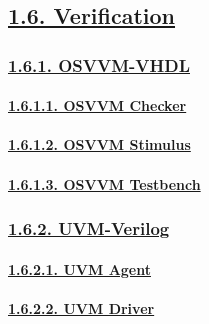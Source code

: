 \documentclass[
]{article}
\begin{document}
\hypertarget{verification}{%
\subsection{\texorpdfstring{\protect\hyperlink{verification-1}{1.6.
Verification}}{1.6. Verification}}\label{verification}}

\hypertarget{osvvm-vhdl}{%
\subsubsection{\texorpdfstring{\protect\hyperlink{osvvm-vhdl-1}{1.6.1.
OSVVM-VHDL}}{1.6.1. OSVVM-VHDL}}\label{osvvm-vhdl}}

\hypertarget{osvvm-checker}{%
\paragraph{\texorpdfstring{\protect\hyperlink{osvvm-checker-1}{1.6.1.1.
OSVVM Checker}}{1.6.1.1. OSVVM Checker}}\label{osvvm-checker}}

\hypertarget{osvvm-stimulus}{%
\paragraph{\texorpdfstring{\protect\hyperlink{osvvm-stimulus-1}{1.6.1.2.
OSVVM Stimulus}}{1.6.1.2. OSVVM Stimulus}}\label{osvvm-stimulus}}

\hypertarget{osvvm-testbench}{%
\paragraph{\texorpdfstring{\protect\hyperlink{osvvm-testbench-1}{1.6.1.3.
OSVVM Testbench}}{1.6.1.3. OSVVM Testbench}}\label{osvvm-testbench}}

\hypertarget{uvm-verilog}{%
\subsubsection{\texorpdfstring{\protect\hyperlink{uvm-verilog-1}{1.6.2.
UVM-Verilog}}{1.6.2. UVM-Verilog}}\label{uvm-verilog}}

\hypertarget{uvm-agent}{%
\paragraph{\texorpdfstring{\protect\hyperlink{uvm-agent-1}{1.6.2.1. UVM
Agent}}{1.6.2.1. UVM Agent}}\label{uvm-agent}}

\hypertarget{uvm-driver}{%
\paragraph{\texorpdfstring{\protect\hyperlink{uvm-driver-1}{1.6.2.2. UVM
Driver}}{1.6.2.2. UVM Driver}}\label{uvm-driver}}
\end{document}
